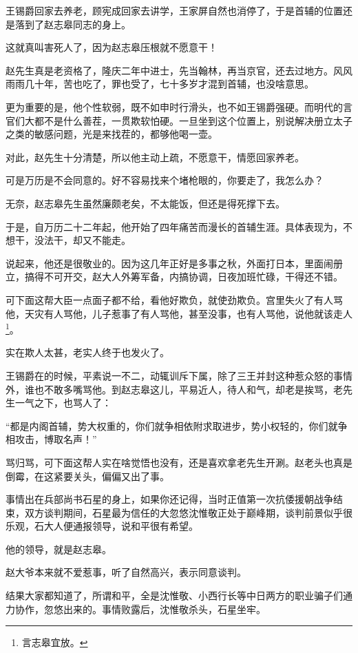 \begin{multicols}{\theparacolNo}
		王锡爵回家去养老，顾宪成回家去讲学，王家屏自然也消停了，于是首辅的位置还是落到了赵志皋同志的身上。

		这就真叫害死人了，因为赵志皋压根就不愿意干！

		赵先生真是老资格了，隆庆二年中进士，先当翰林，再当京官，还去过地方。风风雨雨几十年，苦也吃了，罪也受了，七十多岁才混到首辅，也没啥意思。

		更为重要的是，他个性软弱，既不如申时行滑头，也不如王锡爵强硬。而明代的言官们大都不是什么善茬，一贯欺软怕硬。一旦坐到这个位置上，别说解决册立太子之类的敏感问题，光是来找茬的，都够他喝一壶。

		对此，赵先生十分清楚，所以他主动上疏，不愿意干，情愿回家养老。

		可是万历是不会同意的。好不容易找来个堵枪眼的，你要走了，我怎么办？

		无奈，赵志皋先生虽然廉颇老矣，不太能饭，但还是得死撑下去。

		于是，自万历二十二年起，他开始了四年痛苦而漫长的首辅生涯。具体表现为，不想干，没法干，却又不能走。

		说起来，他还是很敬业的。因为这几年正好是多事之秋，外面打日本，里面闹册立，搞得不可开交，赵大人外筹军备，内搞协调，日夜加班忙碌，干得还不错。

		可下面这帮大臣一点面子都不给，看他好欺负，就使劲欺负。宫里失火了有人骂他，天灾有人骂他，儿子惹事了有人骂他，甚至没事，也有人骂他，说他就该走人\footnote{言志皋宜放。}。

		实在欺人太甚，老实人终于也发火了。

		王锡爵在的时候，平素说一不二，动辄训斥下属，除了三王并封这种惹众怒的事情外，谁也不敢多嘴骂他。到赵志皋这儿，平易近人，待人和气，却老是挨骂，老先生一气之下，也骂人了：

		“都是内阁首辅，势大权重的，你们就争相依附求取进步，势小权轻的，你们就争相攻击，博取名声！”

		骂归骂，可下面这帮人实在啥觉悟也没有，还是喜欢拿老先生开涮。赵老头也真是倒霉，在这紧要关头，偏偏又出了事。

		事情出在兵部尚书石星的身上，如果你还记得，当时正值第一次抗倭援朝战争结束，双方谈判期间，石星最为信任的大忽悠沈惟敬正处于巅峰期，谈判前景似乎很乐观，石大人便通报领导，说和平很有希望。

		他的领导，就是赵志皋。

		赵大爷本来就不爱惹事，听了自然高兴，表示同意谈判。

		结果大家都知道了，所谓和平，全是沈惟敬、小西行长等中日两方的职业骗子们通力协作，忽悠出来的。事情败露后，沈惟敬杀头，石星坐牢。


\end{multicols}
